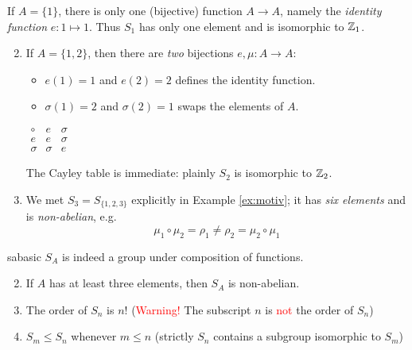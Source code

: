 \begin{examples}{}{}
\exstart If $A=\{1\}$, there is only one (bijective) function $A\to A$, namely the \emph{identity function} $e:1\mapsto 1$. Thus $S_1$ has only one element and is isomorphic to $\mathbb{Z}_1$.
\begin{enumerate}\setcounter{enumi}{1}\itemsep0pt
  \item If $A=\{1,2\}$, then there are \emph{two} bijections $e,\mu:A\to A$:\par
  \begin{minipage}[t]{0.7\linewidth}\vspace{-10pt}
    \begin{itemize}\itemsep0pt
    	\item $e(1)=1$ and $e(2)=2$ defines the identity function.
    	\item $\sigma(1)=2$ and $\sigma(2)=1$ swaps the elements of $A$.
  	\end{itemize}
  \end{minipage}\hfill\begin{minipage}[t]{0.29\linewidth}\vspace{-18pt}
  \flushright $\begin{array}{c||c|c}
  \circ&e&\sigma\\\hline\hline
  e&e&\sigma\\\hline
  \sigma&\sigma&e
  \end{array}$
  \end{minipage}\par

  The Cayley table is immediate: plainly $S_2$ is isomorphic to $\mathbb{Z}_2$.
  
  \item We met $S_3=S_{\{1,2,3\}}$ explicitly in Example \ref{ex:motiv}; it has \emph{six elements} and is \emph{non-abelian}, e.g.
  \[\mu_1\circ\mu_2=\rho_1\neq \rho_2=\mu_2\circ\mu_1\]
\end{enumerate}
\end{examples}

\begin{lemm}{}{sabasic}
\exstart $S_A$ is indeed a group under composition of functions.\vspace{-4pt}
\begin{enumerate}\setcounter{enumi}{1}\itemsep0pt
  \item If $A$ has at least three elements, then $S_A$ is non-abelian.
  \item The order of $S_n$ is $n!$ \hfill (\textcolor{red}{Warning!} The subscript $n$ is \textcolor{red}{not} the order of $S_n$)
  \item $S_m\le S_n$ whenever $m\le n$ \hfill(strictly $S_n$ contains a subgroup isomorphic to $S_m$)
\end{enumerate}
\end{lemm}

